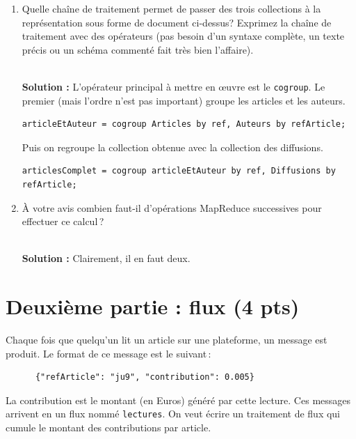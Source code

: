 \documentclass[11pt,a4paper]{article}
\newenvironment{solution}[0]{
~\\ \color{red} \textbf{Solution : }\color{black}}{%
}
\begin{document}
\begin{enumerate}
\begin{enumerate}
     \item Quelle chaîne de traitement permet de passer des trois collections
         à la représentation sous forme de document ci-dessus? Exprimez 
         la chaîne de traitement avec des opérateurs (pas besoin d'un syntaxe complète,
         un texte précis ou un schéma commenté
         fait très bien l'affaire).
      
\begin{solution}
L'opérateur principal à mettre en œuvre est le \texttt{cogroup}. Le premier
(mais l'ordre n'est pas important) groupe les articles et les auteurs.

\begin{verbatim}
articleEtAuteur = cogroup Articles by ref, Auteurs by refArticle;
\end{verbatim} 

Puis on regroupe la collection obtenue avec la collection des diffusions.


\begin{verbatim}
articlesComplet = cogroup articleEtAuteur by ref, Diffusions by refArticle;
\end{verbatim} 
\end{solution}     

\item À votre avis combien faut-il d'opérations MapReduce successives pour effectuer ce calcul\,?

\begin{solution}
Clairement, il en faut deux.
\end{solution}
    \end{enumerate}
\end{enumerate}


\section*{Deuxième partie : flux (4 pts)}

Chaque fois que quelqu'un lit un article sur une plateforme, un 
message est produit. Le format de ce message est le suivant\,:

  \begin{small}
    \begin{verbatim}
      {"refArticle": "ju9", "contribution": 0.005}
    \end{verbatim}
    \end{small}

La contribution est le montant (en Euros) généré par cette lecture. Ces messages
arrivent en  un flux nommé \texttt{lectures}. 
On veut écrire un traitement de flux qui cumule le montant des contributions par article. 
\end{document}
